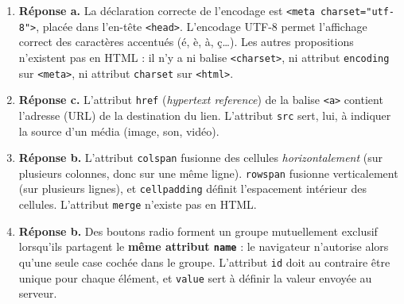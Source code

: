 \documentclass[11pt]{article}
\newcommand{\cle}[1]{{\popxbold\color{popdark}#1}}
\begin{document}
\begin{corrige}
\begin{enumerate}
\item \textbf{Réponse a.} La déclaration correcte de l'encodage est \texttt{<meta charset="utf-8">}, placée dans l'en-tête \texttt{<head>}. L'encodage \cle{UTF-8} permet l'affichage correct des caractères accentués (é, è, à, ç\ldots). Les autres propositions n'existent pas en HTML : il n'y a ni balise \texttt{<charset>}, ni attribut \texttt{encoding} sur \texttt{<meta>}, ni attribut \texttt{charset} sur \texttt{<html>}.
\item \textbf{Réponse c.} L'attribut \texttt{href} (\emph{hypertext reference}) de la balise \texttt{<a>} contient l'adresse (URL) de la destination du lien. L'attribut \texttt{src} sert, lui, à indiquer la source d'un média (image, son, vidéo).
\item \textbf{Réponse b.} L'attribut \texttt{colspan} fusionne des cellules \emph{horizontalement} (sur plusieurs colonnes, donc sur une même ligne). \texttt{rowspan} fusionne verticalement (sur plusieurs lignes), et \texttt{cellpadding} définit l'espacement intérieur des cellules. L'attribut \texttt{merge} n'existe pas en HTML.
\item \textbf{Réponse b.} Des boutons radio forment un groupe mutuellement exclusif lorsqu'ils partagent le \textbf{même attribut \texttt{name}} : le navigateur n'autorise alors qu'une seule case cochée dans le groupe. L'attribut \texttt{id} doit au contraire être unique pour chaque élément, et \texttt{value} sert à définir la valeur envoyée au serveur.
\end{enumerate}
\end{corrige}
\end{document}
